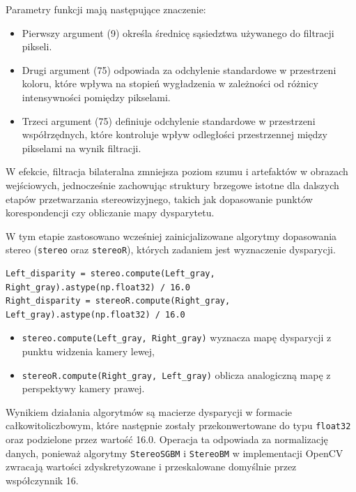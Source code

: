\documentclass[magisterska]{pracadypl}
\begin{document}
Parametry funkcji mają następujące znaczenie:

\begin{itemize}
  \item Pierwszy argument (9) określa średnicę sąsiedztwa używanego do filtracji pikseli.

  \item Drugi argument (75) odpowiada za odchylenie standardowe w przestrzeni koloru, które wpływa na stopień wygładzenia w zależności od różnicy intensywności pomiędzy pikselami.

  \item Trzeci argument (75) definiuje odchylenie standardowe w przestrzeni współrzędnych, które kontroluje wpływ odległości przestrzennej między pikselami na wynik filtracji.
\end{itemize}

W efekcie, filtracja bilateralna zmniejsza poziom szumu i artefaktów w obrazach wejściowych, jednocześnie zachowując struktury brzegowe istotne dla dalszych etapów przetwarzania stereowizyjnego, takich jak dopasowanie punktów korespondencji czy obliczanie mapy dysparytetu.

W tym etapie zastosowano wcześniej zainicjalizowane algorytmy dopasowania stereo (\texttt{stereo} oraz \texttt{stereoR}), których zadaniem jest wyznaczenie dysparycji.

\begin{lstlisting}[style=mypython]
Left_disparity = stereo.compute(Left_gray, Right_gray).astype(np.float32) / 16.0
Right_disparity = stereoR.compute(Right_gray, Left_gray).astype(np.float32) / 16.0
\end{lstlisting}

\begin{itemize}
    \item \texttt{stereo.compute(Left\_gray, Right\_gray)} wyznacza mapę dysparycji z punktu widzenia kamery lewej,
    \item \texttt{stereoR.compute(Right\_gray, Left\_gray)} oblicza analogiczną mapę z perspektywy kamery prawej.
\end{itemize}

Wynikiem działania algorytmów są macierze dysparycji w formacie całkowitoliczbowym, które następnie zostały przekonwertowane do typu \texttt{float32} oraz podzielone przez wartość 16.0. Operacja ta odpowiada za normalizację danych, ponieważ algorytmy \texttt{StereoSGBM} i \texttt{StereoBM} w implementacji OpenCV zwracają wartości zdyskretyzowane i przeskalowane domyślnie przez współczynnik 16.
\end{document}
